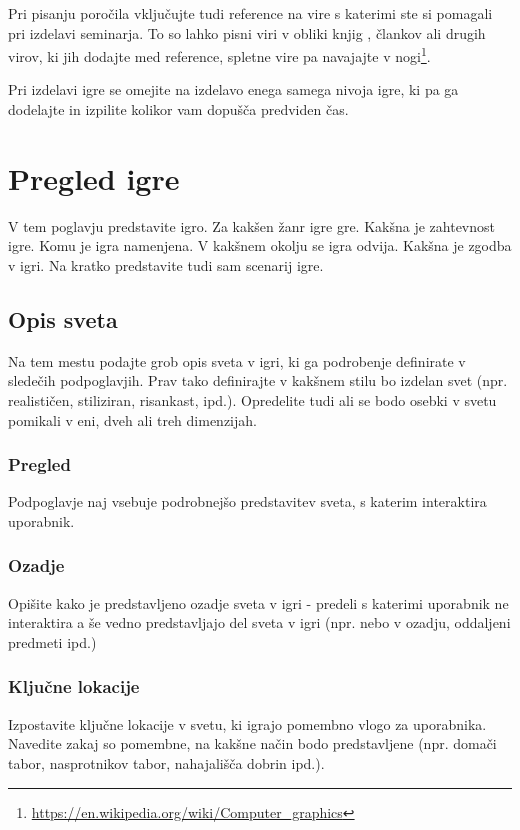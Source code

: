 \documentclass[a4paper]{article}
\begin{document}
Pri pisanju poročila vključujte tudi reference na vire s katerimi ste si pomagali pri izdelavi seminarja. To so lahko pisni viri v obliki knjig \cite{Foley1994}, člankov \cite{Meng2015} ali drugih virov, ki jih dodajte med reference, spletne vire pa navajajte v nogi\footnote{\url{https://en.wikipedia.org/wiki/Computer_graphics}}.

Pri izdelavi igre se omejite na izdelavo enega samega nivoja igre, ki pa ga dodelajte in izpilite kolikor vam do\-pu\-šča predviden čas.




\section{Pregled igre}
V tem poglavju predstavite igro. Za kakšen žanr igre gre. Kakšna je zahtevnost igre. Komu je igra namenjena. V kakšnem okolju se igra odvija. Kakšna je zgodba v igri. Na kratko predstavite tudi sam scenarij igre.

\subsection{Opis sveta}
Na tem mestu podajte grob opis sveta v igri, ki ga podrobenje definirate v sledečih podpoglavjih. Prav tako definirajte v kakšnem stilu bo izdelan svet (npr. realističen, stiliziran, risankast, ipd.). Opredelite tudi ali se bodo osebki v svetu pomikali v eni, dveh ali treh dimenzijah.

\subsubsection{Pregled}
Podpoglavje naj vsebuje podrobnejšo predstavitev sveta, s katerim interaktira uporabnik.

\subsubsection{Ozadje}
Opišite kako je predstavljeno ozadje sveta v igri - predeli s katerimi uporabnik ne interaktira a še vedno predstavljajo del sveta v igri (npr. nebo v ozadju, oddaljeni predmeti ipd.)

\subsubsection{Ključne lokacije}
Izpostavite ključne lokacije v svetu, ki igrajo pomembno vlogo za uporabnika. Navedite zakaj so pomembne, na kakšne način bodo predstavljene (npr. domači tabor, nasprotnikov tabor, nahajališča dobrin  ipd.).
\end{document}

